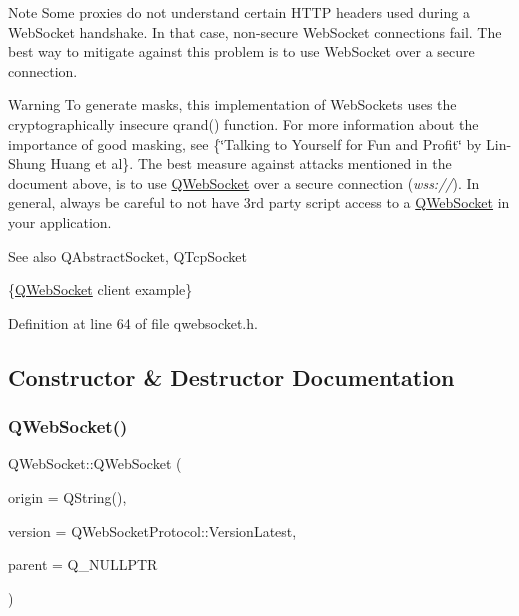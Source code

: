 \begin{DoxyNote}{Note}
Some proxies do not understand certain H\+T\+TP headers used during a Web\+Socket handshake. In that case, non-\/secure Web\+Socket connections fail. The best way to mitigate against this problem is to use Web\+Socket over a secure connection.
\end{DoxyNote}
\begin{DoxyWarning}{Warning}
To generate masks, this implementation of Web\+Sockets uses the cryptographically insecure qrand() function. For more information about the importance of good masking, see  \{\char`\"{}\+Talking to Yourself for Fun and Profit\char`\"{} by Lin-\/\+Shung Huang et al\}. The best measure against attacks mentioned in the document above, is to use \mbox{\hyperlink{class_q_web_socket}{Q\+Web\+Socket}} over a secure connection ({\itshape wss\+://}). In general, always be careful to not have 3rd party script access to a \mbox{\hyperlink{class_q_web_socket}{Q\+Web\+Socket}} in your application.
\end{DoxyWarning}
\begin{DoxySeeAlso}{See also}
Q\+Abstract\+Socket, Q\+Tcp\+Socket

\{\mbox{\hyperlink{class_q_web_socket}{Q\+Web\+Socket}} client example\} 
\end{DoxySeeAlso}


Definition at line 64 of file qwebsocket.\+h.



\subsection{Constructor \& Destructor Documentation}
\mbox{\label{class_q_web_socket_a1dd87330154f6f06e63b3904ccb3aabe}} 
\subsubsection{\texorpdfstring{Q\+Web\+Socket()}{QWebSocket()}}
{\footnotesize\ttfamily Q\+Web\+Socket\+::\+Q\+Web\+Socket (\begin{DoxyParamCaption}\item[{const Q\+String \&}]{origin = {\ttfamily QString()},  }\item[{\mbox{\hyperlink{namespace_q_web_socket_protocol_ad53f2684577effe0a517eadb48714df3}{Q\+Web\+Socket\+Protocol\+::\+Version}}}]{version = {\ttfamily QWebSocketProtocol\+:\+:VersionLatest},  }\item[{Q\+Object $\ast$}]{parent = {\ttfamily Q\+\_\+NULLPTR} }\end{DoxyParamCaption})\hspace{0.3cm}{\ttfamily [explicit]}}



